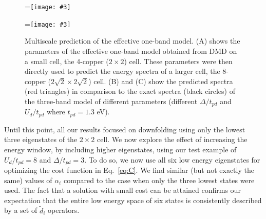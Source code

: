 \documentclass[aps, prb, 11pt]{revtex4-1}
\newcommand{\subfigimgone}[3][,]{%
  \setbox1=\hbox{\texttt{[image: \#3]}}%
  \leavevmode\rlap{\usebox1}%
  \rlap{\hspace*{42pt}\vspace*{12pt}\raisebox{\dimexpr\ht1-1.37\baselineskip}{#2}}%
  \phantom{\usebox1}
}
\newcommand{\subfigimgtwo}[3][,]{%
  \setbox1=\hbox{\texttt{[image: \#3]}}%
  \leavevmode\rlap{\usebox1}%
  \rlap{\hspace*{42pt}\vspace*{12pt}\raisebox{\dimexpr\ht1-1.37\baselineskip}{#2}}%
  \phantom{\usebox1}
}
\begin{document}
\begin{figure}[hbt]
\begin{minipage}{0.57\linewidth}
\subfigimgone[width=0.485\linewidth]{(B)}{./Figures/Predict_8site_Ep_3.eps}
\subfigimgtwo[width=0.485\linewidth]{(C)}{./Figures/Predict_8site_Ep_5.eps}
\end{minipage}
\caption{Multiscale prediction of the effective one-band model. (A) shows the parameters of the effective one-band model obtained from DMD on a small cell, the 4-copper ($2\times2$) cell. 
These parameters were then directly used to predict the energy spectra of a larger cell, the 8-copper ($2\sqrt{2} \times 2\sqrt{2}$) cell. (B) and (C) show the predicted spectra (red triangles) 
in comparison to the exact spectra (black circles) of the three-band model of different parameters (different $\Delta/t_{pd}$ and $U_d/t_{pd}$ where $t_{pd}=1.3$ eV). }
\label{fig:predictivity}
\end{figure} 

Until this point, all our results focused on downfolding using only the lowest three eigenstates of the $2\times2$ cell. 
We now explore the effect of increasing the energy window, by including higher eigenstates, using our 
test example of $U_d/t_{pd}=8$ and $\Delta/t_{pd}=3$. To do so, we now use 
all six low energy eigenstates for optimizing the cost function in Eq.~\eqref{eq:C}. We 
find similar (but not exactly the same) values of $\alpha_i$ compared to 
the case when only the three lowest states were used. The fact that a solution with small cost can be attained 
confirms our expectation that the entire low energy space of six states is consistently 
described by a set of $\tilde{d}_i$ operators. 
\end{document}
